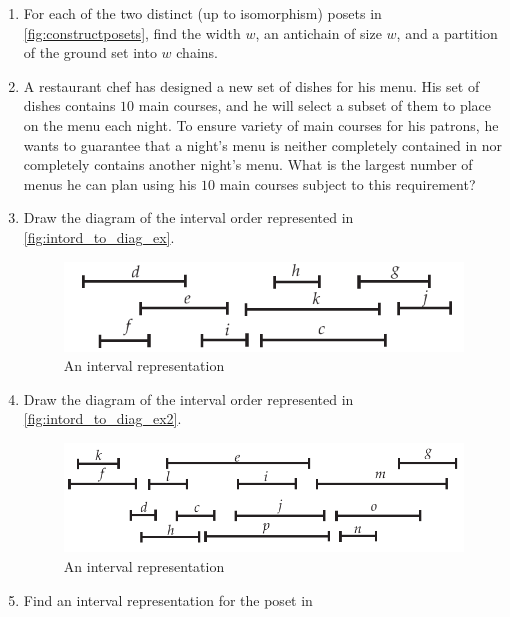 \begin{enumerate}
\begin{center}
  \end{center}
\item For each of the two distinct (up to isomorphism) posets in 
  \autoref{fig:constructposets}, find the width $w$, an
  antichain of size $w$, and a partition of the ground set into $w$
  chains.
\item A restaurant chef has designed a new set of dishes for his
  menu. His set of dishes contains $10$ main courses, and he will
  select a subset of them to place on the menu each night. To ensure
  variety of main courses for his patrons, he wants to guarantee that
  a night's menu is neither completely contained in nor completely
  contains another night's menu. What is the largest number of menus
  he can plan using his $10$ main courses subject to this requirement?
\item Draw the diagram of the interval order represented in
  \autoref{fig:intord_to_diag_ex}.
  \begin{figure}[h]
  \begin{center}
    \includegraphics{posets-figs/intord_to_diag_ex}
  \end{center}
  \caption{An interval representation}\label{fig:intord_to_diag_ex}
  \end{figure}
\item Draw the diagram of the interval order represented in
  \autoref{fig:intord_to_diag_ex2}.
  \begin{figure}[h]
  \begin{center}
    \includegraphics{posets-figs/intord_to_diag_ex2}
  \end{center}
  \caption{An interval representation}\label{fig:intord_to_diag_ex2}
  \end{figure}
\item Find an interval representation for the poset in

\end{enumerate}
